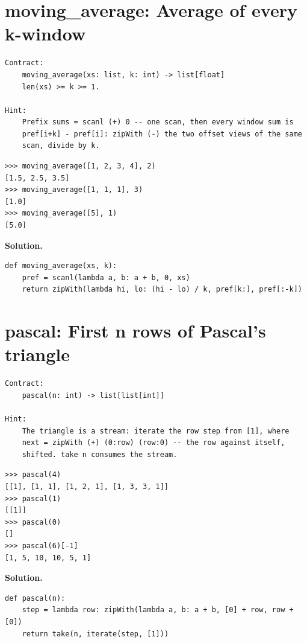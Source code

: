 \documentclass[10pt,letterpaper]{book}
\begin{document}
\section{moving\_average: Average of every k-window}
\begin{lstlisting}[style=ex]
Contract:
    moving_average(xs: list, k: int) -> list[float]
    len(xs) >= k >= 1.

Hint:
    Prefix sums = scanl (+) 0 -- one scan, then every window sum is
    pref[i+k] - pref[i]: zipWith (-) the two offset views of the same
    scan, divide by k.
\end{lstlisting}
\begin{lstlisting}[style=ex]
>>> moving_average([1, 2, 3, 4], 2)
[1.5, 2.5, 3.5]
>>> moving_average([1, 1, 1], 3)
[1.0]
>>> moving_average([5], 1)
[5.0]
\end{lstlisting}
\noindent\textbf{Solution.}
\begin{lstlisting}[style=code]
def moving_average(xs, k):
    pref = scanl(lambda a, b: a + b, 0, xs)
    return zipWith(lambda hi, lo: (hi - lo) / k, pref[k:], pref[:-k])
\end{lstlisting}

\section{pascal: First n rows of Pascal's triangle}
\begin{lstlisting}[style=ex]
Contract:
    pascal(n: int) -> list[list[int]]

Hint:
    The triangle is a stream: iterate the row step from [1], where
    next = zipWith (+) (0:row) (row:0) -- the row against itself,
    shifted. take n consumes the stream.
\end{lstlisting}
\begin{lstlisting}[style=ex]
>>> pascal(4)
[[1], [1, 1], [1, 2, 1], [1, 3, 3, 1]]
>>> pascal(1)
[[1]]
>>> pascal(0)
[]
>>> pascal(6)[-1]
[1, 5, 10, 10, 5, 1]
\end{lstlisting}
\noindent\textbf{Solution.}
\begin{lstlisting}[style=code]
def pascal(n):
    step = lambda row: zipWith(lambda a, b: a + b, [0] + row, row + [0])
    return take(n, iterate(step, [1]))
\end{lstlisting}
\end{document}
